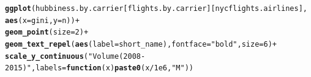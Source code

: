 \documentclass{scrreprt}\usepackage[]{graphicx}\usepackage[]{color}
\makeatletter
\newcommand{\hlnum}[1]{\textcolor[rgb]{0.686,0.059,0.569}{#1}}%
\newcommand{\hlstr}[1]{\textcolor[rgb]{0.192,0.494,0.8}{#1}}%
\newcommand{\hlopt}[1]{\textcolor[rgb]{0,0,0}{#1}}%
\newcommand{\hlstd}[1]{\textcolor[rgb]{0.345,0.345,0.345}{#1}}%
\newcommand{\hlkwa}[1]{\textcolor[rgb]{0.161,0.373,0.58}{\textbf{#1}}}%
\newcommand{\hlkwc}[1]{\textcolor[rgb]{0.333,0.667,0.333}{#1}}%
\newcommand{\hlkwd}[1]{\textcolor[rgb]{0.737,0.353,0.396}{\textbf{#1}}}%
\newenvironment{kframe}{%
 \def\at@end@of@kframe{}%
 \ifinner\ifhmode%
  \def\at@end@of@kframe{\end{minipage}}%
  \begin{minipage}{\columnwidth}%
 \fi\fi%
 \def\FrameCommand##1{\hskip\@totalleftmargin \hskip-\fboxsep
 \colorbox{shadecolor}{##1}\hskip-\fboxsep
     \hskip-\linewidth \hskip-\@totalleftmargin \hskip\columnwidth}%
 \MakeFramed {\advance\hsize-\width
   \@totalleftmargin\z@ \linewidth\hsize
   \@setminipage}}%
 {\par\unskip\endMakeFramed%
 \at@end@of@kframe}
\newenvironment{knitrout}{}{} %
\makeatother
\begin{document}
\begin{figure}
\end{figure}

\begin{knitrout}
\color{fgcolor}\begin{kframe}
\begin{alltt}
\hlkwd{ggplot}\hlstd{(hubbiness.by.carrier[flights.by.carrier][nycflights.airlines],}
       \hlkwd{aes}\hlstd{(}\hlkwc{x} \hlstd{= gini,} \hlkwc{y} \hlstd{= n))} \hlopt{+}
  \hlkwd{geom_point}\hlstd{(}\hlkwc{size} \hlstd{=} \hlnum{2}\hlstd{)} \hlopt{+}
  \hlkwd{geom_text_repel}\hlstd{(}\hlkwd{aes}\hlstd{(}\hlkwc{label} \hlstd{= short_name),} \hlkwc{fontface} \hlstd{=} \hlstr{"bold"}\hlstd{,} \hlkwc{size} \hlstd{=} \hlnum{6}\hlstd{)} \hlopt{+}
  \hlkwd{scale_y_continuous}\hlstd{(}\hlstr{"Volume (2008-2015)"}\hlstd{,} \hlkwc{labels} \hlstd{=} \hlkwa{function}\hlstd{(}\hlkwc{x}\hlstd{)}\hlkwd{paste0}\hlstd{(x}\hlopt{/}\hlnum{1e6}\hlstd{,} \hlstr{"M"}\hlstd{))}
\end{alltt}
\end{kframe}
\end{knitrout}
\end{document}
